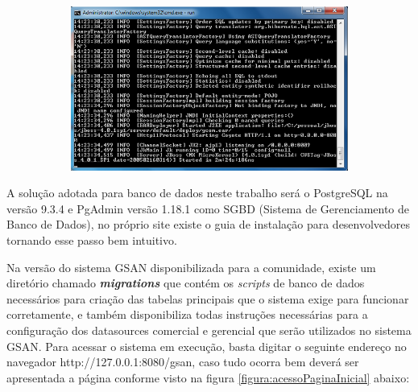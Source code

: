 \begin{figure}[H]
	\centering
	\caption{Executando o sistema GSAN}	
	\label{figura:execucaoSistemaGSAN}
	\begin{subfigure}[H]{\textwidth}
		\centering
	\includegraphics{figuras/executando_jboss.png}	
	\end{subfigure}
\end{figure}	



A solução adotada para banco de dados neste trabalho será o PostgreSQL na versão 9.3.4 e PgAdmin versão 1.18.1 como SGBD (Sistema de Gerenciamento de Banco de Dados), no próprio site existe o guia de instalação para desenvolvedores tornando esse passo bem intuitivo.

Na versão do sistema GSAN disponibilizada para a comunidade, existe um diretório chamado \textbf{\textit{migrations}} que contém os \textit{scripts} de banco de dados necessários para criação das tabelas principais que o sistema exige para funcionar corretamente, e também disponibiliza todas instruções necessárias para a configuração dos datasources comercial e gerencial que serão utilizados no sistema GSAN.
Para acessar o sistema em execução, basta digitar o seguinte endereço no navegador http://127.0.0.1:8080/gsan, caso tudo ocorra bem deverá ser apresentada a página conforme visto na figura \ref{figura:acessoPaginaInicial} abaixo:

